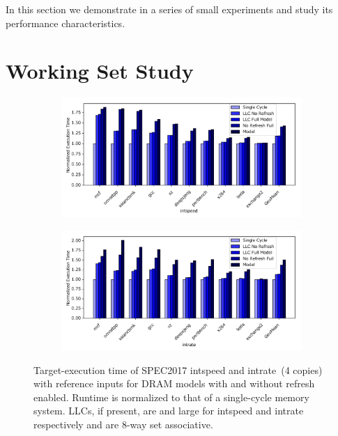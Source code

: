 In this section we demonstrate \PNAME in a series of small experiments and
study its performance characteristics.

\vspace{-0.05in}
\section{Working Set Study}

\begin{figure}[t]
    \vspace{-0.15in}
    \centering
    \begin{subfigure}[t]{0.49\textwidth}
        \includegraphics[width=\columnwidth]{figures/dram_fidelity_speed_slowdown.pdf}
    \end{subfigure}
    \begin{subfigure}[t]{0.49\textwidth}
        \includegraphics[width=\columnwidth]{figures/dram_fidelity_rate_slowdown.pdf}
    \end{subfigure}
    \vspace{-0.20in}
    \caption{Target-execution time of SPEC2017 intspeed and intrate~(4 copies)
    with reference inputs for DRAM models with and without refresh enabled.
    Runtime is normalized to that of a single-cycle memory system. LLCs, if
    present, are  and  large for intspeed and
    intrate respectively and are 8-way set associative.}
    \label{fig:model-fidelity-sweep}
    \vspace{-0.10in}
\end{figure}
